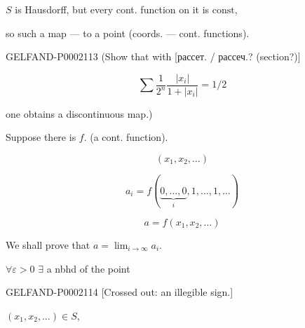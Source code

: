 $S$ is Hausdorff, but every cont. function on it is $\mathrm{const}$,



so such a map --- to a point (coords. --- cont. functions).



\begin{GelfandAdjacentEvidence}{GELFAND-P000211}{3}
(Show that with [рассет. / рассеч.? (section?)]
\end{GelfandAdjacentEvidence}

\begin{equation*}\sum\frac{1}{2^n}\frac{|x_i|}{1+|x_i|}=1/2\end{equation*}



one obtains a discontinuous map.)



Suppose there is $f$. (a cont. function).



\begin{equation*}(x_1, x_2,\ldots)\end{equation*}



\begin{equation*}a_i=f (\underbrace{0,\ldots,0}_{i},1,\ldots,1,\ldots)\end{equation*}



\begin{equation*}a=f (x_1, x_2,\ldots)\end{equation*}



We shall prove that $a=\lim_{i\to\infty}a_i$.



$\forall\varepsilon>0$ $\exists$ a nbhd of the point



\begin{GelfandAdjacentEvidence}{GELFAND-P000211}{4}
[Crossed out: an illegible sign.]
\end{GelfandAdjacentEvidence}

$(x_1, x_2,\ldots)\in S$,



